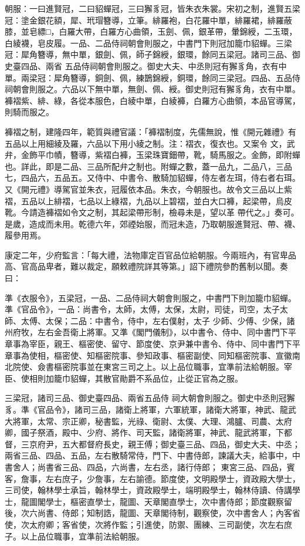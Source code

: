 \begin{pinyinscope}
 朝服：一曰進賢冠，二曰貂蟬冠，三曰獬豸冠，皆朱衣朱裳。宋初之制，進賢五梁冠：塗金銀花額，犀、玳瑁簪導，立筆。緋羅袍，白花羅中單，緋羅裙，緋羅蔽膝，並皂縹□，白羅大帶，白羅方心曲領，玉劍、佩，銀革帶，暈錦綬，二玉環，白綾襪，皂皮履。一品、二品侍祠朝會則服之，中書門下則冠加籠巾貂蟬。三梁冠：犀角簪導，無中單，銀劍、佩，師子錦綬，銀環，餘同五梁冠。諸司三品、御史臺四品、兩省
 五品侍祠朝會則服之。御史大夫、中丞則冠有獬豸角，衣有中單。兩梁冠：犀角簪導，銅劍、佩，練鵲錦綬，銅環，餘同三梁冠。四品、五品侍祠朝會則服之。六品以下無中單，無劍、佩、綬。御史則冠有獬豸角，衣有中單。褲褶紫、緋、綠，各從本服色，白綾中單，白綾褲，白羅方心曲領，本品官導駕，則騎而服之。



 褲褶之制，建隆四年，範質與禮官議：「褲褶制度，先儒無說，惟《開元雜禮》有五品以上用細綾及羅，六品以下用小綾之制。注：褶衣，復衣也。又案令
 文，武弁，金飾平巾幘，簪導，紫褶白褲，玉梁珠寶鈿帶，靴，騎馬服之。金飾，即附蟬也。詳此，即是二品、三品所配弁之制也。附蟬之數，蓋一品九，二品八，三品七，四品六，五品五。又侍中、中書令、散騎加貂蟬，侍左者左珥，侍右者右珥。又《開元禮》導駕官並朱衣，冠履依本品。朱衣，今朝服也。故令文三品以上紫褶，五品以上緋褶，七品以上綠褶，九品以上碧褶，並白大口褲，起梁帶，烏皮靴。今請造褲褶如令文之制，其起梁帶形制，檢尋未是，望以革
 帶代之。」奏可。是歲，造成而未用。乾德六年，郊禋始服，而冠未造，乃取朝服進賢冠、帶、襪、履參用焉。



 康定二年，少府監言：「每大禮，法物庫定百官品位給朝服。今兩班內，有官卑品高、官高品卑者，難以裁定，願敕禮院詳其等第。」詔下禮院參酌舊制以聞。奏曰：



 準《衣服令》，五梁冠，一品、二品侍祠大朝會則服之，中書門下則加籠巾貂蟬。準《官品令》，一品：尚書令，太師，太傅，太保，太尉，司徒，司空，太子太師、太傅、太保；二品：中書令，侍中，左右僕射，太子
 少師、少傅、少保，諸州府牧，左右金吾衛上將軍。又準《閣門儀制》，以中書令、侍中、同中書門下平章事為宰臣，親王、樞密使、留守、節度使、京尹兼中書令、侍中、同中書門下平章事為使相，樞密使、知樞密院事、參知政事、樞密副使、同知樞密院事、宣徽南北院使、僉書樞密院事並在東宮三司之上。以上品位職事，宜準前法給朝服。宰臣、使相則加籠巾貂蟬，其散官勛爵不系品位，止從正官為之服。



 三梁冠，諸司三品、御史臺四品、兩省五品侍
 祠大朝會則服之。御史中丞則冠獬豸。準《官品令》，諸司三品，諸衛上將軍，六軍統軍，諸衛大將軍，神武、龍武大將軍，太常、宗正卿，秘書監，光祿、衛尉、太僕、大理、鴻臚、司農、太府卿，國子祭酒，殿中、少府、將作、司天監，諸衛將軍，神武、龍武將軍，下都督，三京府尹，五大都督府長史，親王傅；御史臺三品、四品，御史大夫、中丞；兩省三品、四品、五品，左右散騎常侍，門下、中書侍郎，諫議大夫，給事中，中書舍人；尚書省三品、四品，六尚書，左右丞，諸行侍郎；
 東宮三品、四品，賓客，詹事，左右庶子，少詹事，左右諭德。節度使，文明殿學士，資政殿大學士，三司使，翰林學士承旨，翰林學士，資政殿學士，端明殿學士，翰林侍讀、侍講學士，龍圖閣學士，樞密直學士，龍圖、天章閣直學士，次中書侍郎；節度觀察留後，次六尚書、侍郎；知制誥，龍圖、天章閣待制，觀察使，次中書舍人；內客省使，次太府卿；客省使，次將作監；引進使，防禦、團練、三司副使，次左右庶子。以上品位職事，宜準前法給朝服。




\end{pinyinscope}
